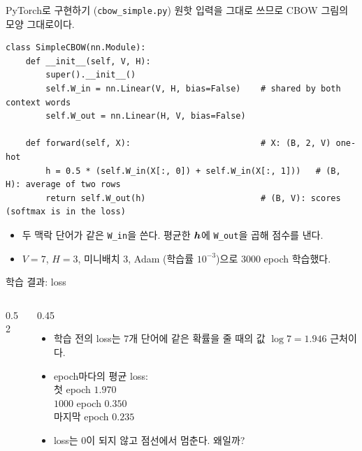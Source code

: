 \documentclass[aspectratio=169,11pt]{beamer}
\begin{document}
\begin{frame}[fragile]{PyTorch로 구현하기 (\texttt{cbow\_simple.py})}
원핫 입력을 그대로 쓰므로 CBOW 그림의 모양 그대로이다.
\begin{lstlisting}
class SimpleCBOW(nn.Module):
    def __init__(self, V, H):
        super().__init__()
        self.W_in = nn.Linear(V, H, bias=False)    # shared by both context words
        self.W_out = nn.Linear(H, V, bias=False)

    def forward(self, X):                          # X: (B, 2, V) one-hot
        h = 0.5 * (self.W_in(X[:, 0]) + self.W_in(X[:, 1]))   # (B, H): average of two rows
        return self.W_out(h)                       # (B, V): scores (softmax is in the loss)
\end{lstlisting}
\begin{itemize}
\item 두 맥락 단어가 같은 \texttt{W\_in}을 쓴다. 평균한 $\bm{h}$에 \texttt{W\_out}을 곱해 점수를 낸다.
\item $V=7$, $H=3$, 미니배치 $3$, Adam (학습률 $10^{-3}$)으로 $3000$ epoch 학습했다.
\end{itemize}
\end{frame}

\begin{frame}{학습 결과: loss}
\begin{columns}[c,onlytextwidth]
\begin{column}{0.52\textwidth}
\end{column}
\begin{column}{0.45\textwidth}
\begin{itemize}
\item 학습 전의 loss는 $7$개 단어에 같은 확률을 줄 때의 값 $\log7=1.946$ 근처이다.
\item epoch마다의 평균 loss: \\
첫 epoch $1.970$ \\
$1000$ epoch $0.350$ \\
마지막 epoch $0.235$
\item loss는 $0$이 되지 않고 점선에서 멈춘다. 왜일까?
\end{itemize}
\end{column}
\end{columns}
\end{frame}
\end{document}
